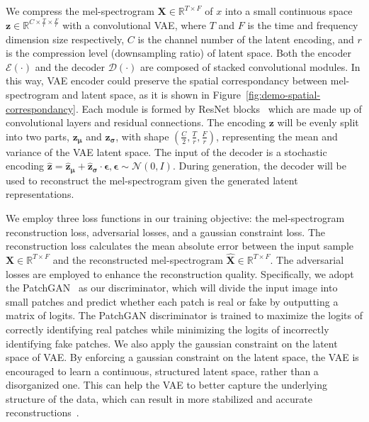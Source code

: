 \documentclass{article}
\begin{document}
We compress the mel-spectrogram $\boldsymbol{X}\in \mathbb{R}^{T\times F}$ of $x$ into a small continuous space $\boldsymbol{z}\in \mathbb{R}^{C\times \frac{T}{r}\times \frac{F}{r}}$ with a convolutional VAE, where $T$ and $F$ is the time and frequency dimension size respectively, $C$ is the channel number of the latent encoding, and $r$ is the compression level (downsampling ratio) of latent space. Both the encoder $\mathcal{E}(\cdot)$ and the decoder $\mathcal{D}(\cdot)$ are composed of stacked convolutional modules. In this way, VAE encoder could preserve the spatial correspondancy between mel-spectrogram and latent space, as it is shown in Figure~\ref{fig:demo-spatial-correspondancy}. Each module is formed by ResNet blocks~\cite{kong2021decoupling} which are made up of convolutional layers and residual connections. The encoding $\boldsymbol{z}$ will be evenly split into two parts, $\boldsymbol{z}_{\boldsymbol{\mu}}$ and $\boldsymbol{z}_{\boldsymbol{\sigma}}$, with shape $(\frac{C}{2}, \frac{T}{r}, \frac{F}{r})$, representing the mean and variance of the VAE latent space. The input of the decoder is a stochastic encoding $\boldsymbol{\hat{z}}=\boldsymbol{\hat{z}}_{\boldsymbol{\mu}}+\boldsymbol{\hat{z}}_{\boldsymbol{\sigma}} \cdot \boldsymbol{\epsilon}, \boldsymbol{\epsilon} \sim \mathcal{N}(0, I)$. During generation, the decoder will be used to reconstruct the mel-spectrogram given the generated latent representations.


We employ three loss functions in our training objective: the mel-spectrogram reconstruction loss, adversarial losses, and a gaussian constraint loss. The reconstruction loss calculates the mean absolute error between the input sample $\boldsymbol{X}\in \mathbb{R}^{T\times F}$ and the reconstructed mel-spectrogram $\hat{\boldsymbol{X}}\in \mathbb{R}^{T\times F}$. The adversarial losses are employed to enhance the reconstruction quality. Specifically, we adopt the PatchGAN~\citep{isola2017image} as our discriminator, which will divide the input image into small patches and predict whether each patch is real or fake by outputting a matrix of logits. 
The PatchGAN discriminator is trained to maximize the logits of correctly identifying real patches while minimizing the logits of incorrectly identifying fake patches. We also apply the gaussian constraint on the latent space of VAE. By enforcing a gaussian constraint on the latent space, the VAE is encouraged to learn a continuous, structured latent space, rather than a disorganized one. This can help the VAE to better capture the underlying structure of the data, which can result in more stabilized and accurate reconstructions~\cite{kingma2013auto}. 
\end{document}
